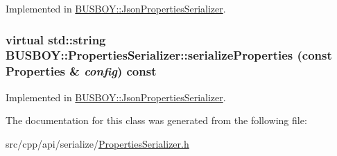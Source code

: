 Implemented in \hyperlink{classBUSBOY_1_1JsonPropertiesSerializer_ac42a8bb4281c5a4c079df3be8fd972d2}{BUSBOY::JsonPropertiesSerializer}.\hypertarget{classBUSBOY_1_1PropertiesSerializer_abd6db2e7700d60b30f3ff51daff343d9}{
\subsubsection[{serializeProperties}]{\setlength{\rightskip}{0pt plus 5cm}virtual std::string BUSBOY::PropertiesSerializer::serializeProperties (const {\bf Properties} \& {\em config}) const}}
\label{classBUSBOY_1_1PropertiesSerializer_abd6db2e7700d60b30f3ff51daff343d9}


Implemented in \hyperlink{classBUSBOY_1_1JsonPropertiesSerializer_ac0ff156d10457163c883e668011da97e}{BUSBOY::JsonPropertiesSerializer}.

The documentation for this class was generated from the following file:\begin{DoxyCompactItemize}
\item 
src/cpp/api/serialize/\hyperlink{PropertiesSerializer_8h}{PropertiesSerializer.h}\end{DoxyCompactItemize}
